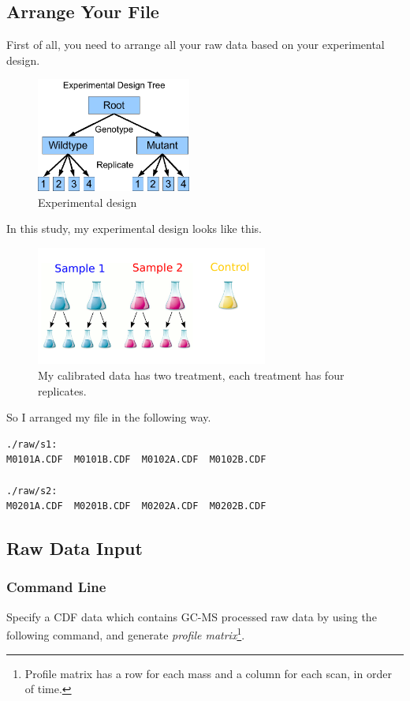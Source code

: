 \documentclass[11pt,a4paper]{article}
\begin{document}
\subsection{Arrange Your File}
First of all, you need to arrange all your raw data based on your
experimental design.

\begin{figure}[h!t!b!p]
\begin{center}
  \includegraphics[width=2in]{exp-design-tree.png}
\caption{\label{fig:genprofile}Experimental design}
\end{center}
\end{figure}
In this study, my experimental design looks like this.
\begin{figure}[h!t!b!p]
\begin{center}
  \includegraphics[width=3in]{design.png}
\caption{\label{fig:genprofile}My calibrated data has two treatment, each treatment has four replicates.}
\end{center}
\end{figure}

So I arranged my file in the following way.
\begin{verbatim}
./raw/s1:
M0101A.CDF  M0101B.CDF  M0102A.CDF  M0102B.CDF

./raw/s2:
M0201A.CDF  M0201B.CDF  M0202A.CDF  M0202B.CDF
\end{verbatim}
\newpage

\subsection{Raw Data Input}
\subsubsection*{Command Line}
Specify a CDF data which contains GC-MS processed raw data by using
the following command, and generate \emph{profile
  matrix}\footnote[1]{Profile matrix has a row for each mass and a
  column for each scan, in order of time.}.
\end{document}
